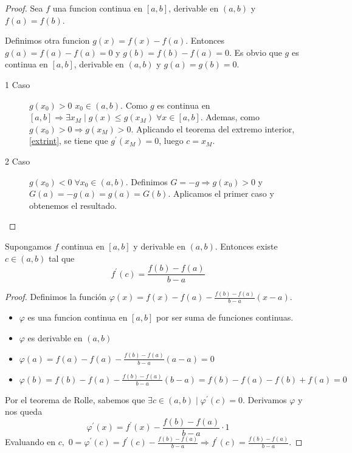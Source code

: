 \begin{proof}
	Sea \(f\) una funcion continua en \([a,b ]\), derivable en \((a,b )\) y \(f(a) = f(b )\).
	
	Definimos otra funcion \(g(x) = f(x) - f(a)\). Entonces \(g(a) = f(a) - f(a) = 0 \) y \(g(b) = f(b) - f(a) = 0 \). Es obvio que \(g\) es continua en \([a,b ]\), derivable en \((a,b )\) y \(g(a) = g(b) = 0 \).
	\begin{description}
		\item[1 Caso] \(g(x_0) > 0 \) \(x_0 \in (a,b )\). Como \(g \) es continua en \([a,b ] \Rightarrow \exists x_M \mid g(x) \leq g(x_M) \; \forall x \in [a,b]\). Ademas, como \(g(x_0) > 0 \Rightarrow g(x_M) > 0\). Aplicando el teorema del extremo interior, \ref{extrint}, se tiene que \(g^\prime (x_M) = 0\), luego \(c = x_M\).
		\item[2 Caso] \(g(x_0) < 0 \; \forall x_0 \in (a,b )\). Definimos \(G = -g \Rightarrow g(x_0) > 0\) y \(G(a) = -g(a) = g(a) = G(b )\). Aplicamos el primer caso y obtenemos el resultado.
	\end{description}
\end{proof}

\begin{theorem}
	Supongamos \(f \) continua en \([a,b ]\) y derivable en \((a,b )\). Entonces existe \(c \in (a,b )\) tal que
	\[
		f^\prime (c) = \frac{f(b) - f(a)}{b - a}
	\]
\end{theorem}
\begin{proof}
	Definimos la función \(\varphi(x) = f(x) - f(a) - \frac{f(b) - f(a)}{b - a} (x - a)\).
	\begin{itemize}
		\item \(\varphi\) es una funcion continua en \([a,b ]\) por ser suma de funciones continuas.
		\item \(\varphi\) es derivable en \((a,b )\)
		\item \(\varphi (a) = f(a) - f(a) - \frac{f(b) - f(a)}{b - a} (a - a) = 0\)
		\item \(\varphi (b) = f(b) - f(a) - \frac{f(b) - f(a)}{b - a} (b - a) = f(b) - f(a) - f(b) + f(a) = 0\)
	\end{itemize}
	Por el teorema de Rolle, sabemos que \(\exists c \in (a,b) \mid \varphi^\prime (c) = 0 \). Derivamos \(\varphi\) y nos queda
	\[
		\varphi^\prime (x) = f^\prime (x) - \frac{f(b) - f(a)}{b - a} \cdot 1
	\]
	Evaluando en \(c ,\) \(0 = \varphi^\prime (c) = f^\prime (c) - \frac{f(b) - f(a)}{b - a} \Rightarrow f^\prime (c) = \frac{f(b) - f(a)}{b - a }\).
\end{proof}

